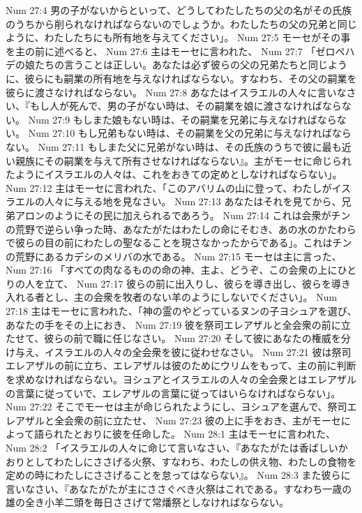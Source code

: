 Num 27:4  男の子がないからといって、どうしてわたしたちの父の名がその氏族のうちから削られなければならないのでしょうか。わたしたちの父の兄弟と同じように、わたしたちにも所有地を与えてください」。
Num 27:5  モーセがその事を主の前に述べると、
Num 27:6  主はモーセに言われた、
Num 27:7  「ゼロペハデの娘たちの言うことは正しい。あなたは必ず彼らの父の兄弟たちと同じように、彼らにも嗣業の所有地を与えなければならない。すなわち、その父の嗣業を彼らに渡さなければならない。
Num 27:8  あなたはイスラエルの人々に言いなさい、『もし人が死んで、男の子がない時は、その嗣業を娘に渡さなければならない。
Num 27:9  もしまた娘もない時は、その嗣業を兄弟に与えなければならない。
Num 27:10  もし兄弟もない時は、その嗣業を父の兄弟に与えなければならない。
Num 27:11  もしまた父に兄弟がない時は、その氏族のうちで彼に最も近い親族にその嗣業を与えて所有させなければならない』。主がモーセに命じられたようにイスラエルの人々は、これをおきての定めとしなければならない」。
Num 27:12  主はモーセに言われた、「このアバリムの山に登って、わたしがイスラエルの人々に与える地を見なさい。
Num 27:13  あなたはそれを見てから、兄弟アロンのようにその民に加えられるであろう。
Num 27:14  これは会衆がチンの荒野で逆らい争った時、あなたがたはわたしの命にそむき、あの水のかたわらで彼らの目の前にわたしの聖なることを現さなかったからである」。これはチンの荒野にあるカデシのメリバの水である。
Num 27:15  モーセは主に言った、
Num 27:16  「すべての肉なるものの命の神、主よ、どうぞ、この会衆の上にひとりの人を立て、
Num 27:17  彼らの前に出入りし、彼らを導き出し、彼らを導き入れる者とし、主の会衆を牧者のない羊のようにしないでください」。
Num 27:18  主はモーセに言われた、「神の霊のやどっているヌンの子ヨシュアを選び、あなたの手をその上におき、
Num 27:19  彼を祭司エレアザルと全会衆の前に立たせて、彼らの前で職に任じなさい。
Num 27:20  そして彼にあなたの権威を分け与え、イスラエルの人々の全会衆を彼に従わせなさい。
Num 27:21  彼は祭司エレアザルの前に立ち、エレアザルは彼のためにウリムをもって、主の前に判断を求めなければならない。ヨシュアとイスラエルの人々の全会衆とはエレアザルの言葉に従っていで、エレアザルの言葉に従ってはいらなければならない」。
Num 27:22  そこでモーセは主が命じられたようにし、ヨシュアを選んで、祭司エレアザルと全会衆の前に立たせ、
Num 27:23  彼の上に手をおき、主がモーセによって語られたとおりに彼を任命した。
Num 28:1  主はモーセに言われた、
Num 28:2  「イスラエルの人々に命じて言いなさい、『あなたがたは香ばしいかおりとしてわたしにささげる火祭、すなわち、わたしの供え物、わたしの食物を定めの時にわたしにささげることを怠ってはならない』。
Num 28:3  また彼らに言いなさい、『あなたがたが主にささぐべき火祭はこれである。すなわち一歳の雄の全き小羊二頭を毎日ささげて常燔祭としなければならない。
